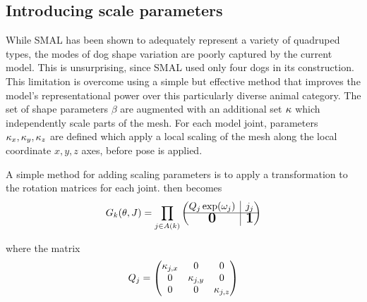 \subsection{Introducing scale parameters}

While SMAL has been shown to adequately represent a variety of quadruped types, the modes of dog shape variation are poorly captured by the current model. This is unsurprising, since SMAL used only four dogs in its construction. This limitation is overcome using a simple but effective method that improves the model's representational power over this particularly diverse animal category. The set of shape parameters $\beta$ are augmented with an additional set $\kappa$ which independently scale parts of the mesh. For each model joint, parameters ${\kappa_x,\kappa_y,\kappa_z}$ are defined which apply a local scaling of the mesh along the local coordinate $x, y, z$ axes, before pose is applied. 

A simple method for adding scaling parameters is to apply a transformation to the rotation matrices for each joint.  then becomes
\begin{equation}
    G_{k}(\pose,\smalrestJ) = \prod_{j \in A(k)} 
    \begin{pmatrix}
        Q_{j} \exp(\poseele{j})
        & \rvline 
        & j_{j} \\
    \hline
        \bigzero
        & \rvline 
        & \bigone
    \end{pmatrix}
\end{equation}

where the matrix
\begin{equation}
    Q_{j} = \begin{pmatrix}
        \kappa_{j,x} & 0 & 0 \\
        0 & \kappa_{j,y} & 0 \\
        0 & 0 & \kappa_{j,z}
    \end{pmatrix}
\end{equation}

